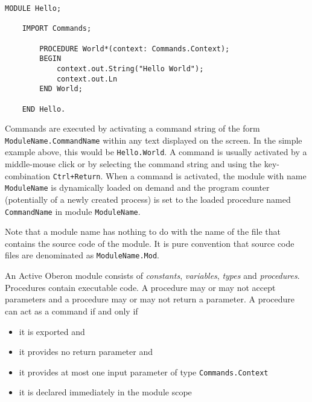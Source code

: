 \documentclass[a4wide,11pt]{article}
\begin{document}
\begin{lstlisting}[language=Oberon,frame=none,caption=A simple Oberon Module]
    MODULE Hello;

    IMPORT Commands;

        PROCEDURE World*(context: Commands.Context);
        BEGIN
            context.out.String("Hello World");
            context.out.Ln
        END World;

    END Hello.
\end{lstlisting}

Commands are executed by activating a command string of the form \verb+ModuleName.CommandName+ within any text displayed on the screen. In the simple example above, this would be \verb+Hello.World+. A command is usually activated by a middle-mouse click or by selecting the command string and using the key-combination \verb|Ctrl+Return|. When a command is activated, the module with name \verb+ModuleName+ is dynamically loaded on demand and the program counter (potentially of a newly created process) is set to the loaded procedure named \verb+CommandName+ in module \verb+ModuleName+.

Note that a module name has nothing to do with the name of the file that contains the source code of the module. It is pure convention that source code files are denominated as \verb+ModuleName.Mod+.

An Active Oberon module consists of {\em constants}, {\em variables}, {\em types} and {\em procedures}. Procedures contain executable code. A procedure may or may not accept parameters and a procedure may or may not return a parameter. A procedure can act as a command if and only if
\begin{itemize}
\item it is exported and
\item it provides no return parameter and
\item it provides at most one input parameter of type \verb+Commands.Context+
\item it is declared immediately in the module scope
\end{itemize}
\end{document}
